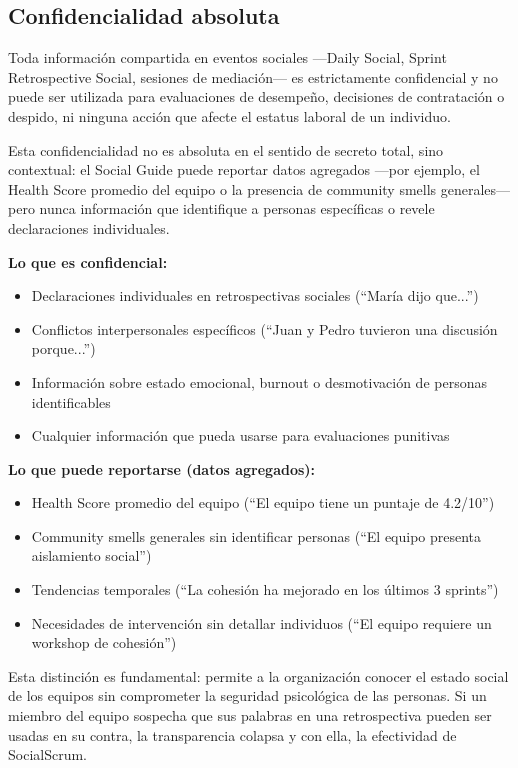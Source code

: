 \subsection{Confidencialidad absoluta}

Toda información compartida en eventos sociales —Daily Social, Sprint Retrospective Social, sesiones de mediación— es estrictamente confidencial y no puede ser utilizada para evaluaciones de desempeño, decisiones de contratación o despido, ni ninguna acción que afecte el estatus laboral de un individuo.

Esta confidencialidad no es absoluta en el sentido de secreto total, sino contextual: el Social Guide puede reportar datos agregados —por ejemplo, el Health Score promedio del equipo o la presencia de community smells generales— pero nunca información que identifique a personas específicas o revele declaraciones individuales.

\textbf{Lo que es confidencial:}
\begin{itemize}
    \item Declaraciones individuales en retrospectivas sociales (``María dijo que...'')
    \item Conflictos interpersonales específicos (``Juan y Pedro tuvieron una discusión porque...'')
    \item Información sobre estado emocional, burnout o desmotivación de personas identificables
    \item Cualquier información que pueda usarse para evaluaciones punitivas
\end{itemize}

\textbf{Lo que puede reportarse (datos agregados):}
\begin{itemize}
    \item Health Score promedio del equipo (``El equipo tiene un puntaje de 4.2/10'')
    \item Community smells generales sin identificar personas (``El equipo presenta aislamiento social'')
    \item Tendencias temporales (``La cohesión ha mejorado en los últimos 3 sprints'')
    \item Necesidades de intervención sin detallar individuos (``El equipo requiere un workshop de cohesión'')
\end{itemize}

Esta distinción es fundamental: permite a la organización conocer el estado social de los equipos sin comprometer la seguridad psicológica de las personas. Si un miembro del equipo sospecha que sus palabras en una retrospectiva pueden ser usadas en su contra, la transparencia colapsa y con ella, la efectividad de SocialScrum.

